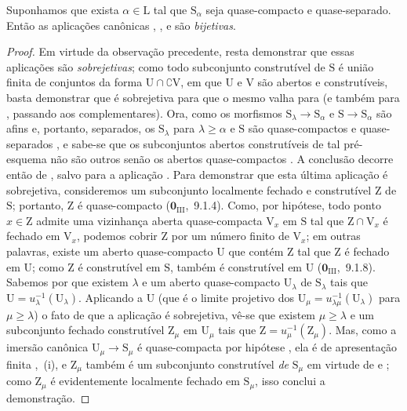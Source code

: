 \begin{theorem}[8.3.11]
\label{IV.8.3.11}
Suponhamos que exista $\alpha\in\mathrm{L}$ tal que $\mathrm{S}_\alpha$ seja quase-compacto e quase-separado.
Então as aplicações canônicas , ,  e  são \emph{bijetivas}.
\end{theorem}
\begin{proof}
Em virtude da observação precedente, resta demonstrar que essas aplicações são \emph{sobrejetivas}; como todo subconjunto construtível de $\mathrm{S}$ é união finita de conjuntos da forma $\mathrm{U}\cap\complement\mathrm{V}$, em que $\mathrm{U}$ e $\mathrm{V}$ são abertos e construtíveis, basta demonstrar que  é sobrejetiva para que o mesmo valha para  (e também para , passando aos complementares).
Ora, como os morfismos $\mathrm{S}_\lambda\to\mathrm{S}_\alpha$ e $\mathrm{S}\to\mathrm{S}_\alpha$ são afins e, portanto, separados, os $\mathrm{S}_\lambda$ para $\lambda\geqslant\alpha$ e $\mathrm{S}$ são quase-compactos e quase-separados , e sabe-se que os subconjuntos abertos construtíveis de tal pré-esquema não são outros senão os abertos quase-compactos .
A conclusão decorre então de , salvo para a aplicação .
Para demonstrar que esta última aplicação é sobrejetiva, consideremos um subconjunto localmente fechado e construtível $\mathrm{Z}$ de $\mathrm{S}$; portanto, $\mathrm{Z}$ é quase-compacto ($\mathbf{0}_{\mathrm{III}}$,~9.1.4).
Como, por hipótese, todo ponto $x\in\mathrm{Z}$ admite uma vizinhança aberta quase-compacta $\mathrm{V}_x$ em $\mathrm{S}$ tal que $\mathrm{Z}\cap\mathrm{V}_x$ é fechado em $\mathrm{V}_x$, podemos cobrir $\mathrm{Z}$ por um número finito de $\mathrm{V}_x$; em outras palavras, existe um aberto quase-compacto $\mathrm{U}$ que contém $\mathrm{Z}$ tal que $\mathrm{Z}$ é fechado em $\mathrm{U}$; como $\mathrm{Z}$ é construtível em $\mathrm{S}$, também é construtível em $\mathrm{U}$ ($\mathbf{0}_{\mathrm{III}}$,~9.1.8).
Sabemos por  que existem $\lambda$ e um aberto quase-compacto $\mathrm{U}_\lambda$ de $\mathrm{S}_\lambda$ tais que $\mathrm{U}=u_\lambda^{-1}(\mathrm{U}_\lambda)$.
Aplicando a $\mathrm{U}$ (que é o limite projetivo dos $\mathrm{U}_\mu=u_{\lambda\mu}^{-1}(\mathrm{U}_\lambda)$ para $\mu\geqslant\lambda$) o fato de que a aplicação  é sobrejetiva, vê-se que existem $\mu\geqslant\lambda$ e um subconjunto fechado construtível $\mathrm{Z}_\mu$ em $\mathrm{U}_\mu$ tais que $\mathrm{Z}=u_\mu^{-1}(\mathrm{Z}_\mu)$.
Mas, como a imersão canônica $\mathrm{U}_\mu\to\mathrm{S}_\mu$ é quase-compacta por hipótese , ela é de apresentação finita ,~(i), e $\mathrm{Z}_\mu$ também é um subconjunto construtível \emph{de} $\mathrm{S}_\mu$ em virtude de  e ; como $\mathrm{Z}_\mu$ é evidentemente localmente fechado em $\mathrm{S}_\mu$, isso conclui a demonstração.
\end{proof}

